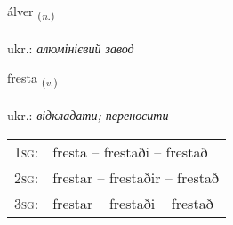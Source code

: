 \documentclass[frontgrid, backgrid]{flacards}\usepackage[]{graphicx}\usepackage[]{xcolor}
\begin{document}
\renewcommand{\flhead}{\vskip5pt \fboxsep=0pt {\small\bfseries\footnotesize Nafnorð | іменник}}
\renewcommand{\fcfoot}{\vskip5pt \fboxsep=0pt \hspace{2pt}{\small\bfseries\footnotesize 2K}}

\renewcommand{\blhead}{\vskip5pt {\small\bfseries\footnotesize Nafnorð | іменник }}
\renewcommand{\bcfoot}{\vskip5pt \hspace{2pt}{\small\bfseries\footnotesize 2K}}


{álver \small{\textsubscript{(\textit{n.})}} \\[1ex] %
\textphonetic{[aulvɛr]} \\
ukr.: \emph{алюмінієвий завод} \\  [2ex]
\renewcommand*{\arraystretch}{0.8}
}

\renewcommand{\flhead}{\vskip5pt \fboxsep=0pt {\small\bfseries\footnotesize Sagnorð | дієслово}}
\renewcommand{\fcfoot}{\vskip5pt \fboxsep=0pt \hspace{2pt}{\small\bfseries\footnotesize 2K}}

\renewcommand{\blhead}{\vskip5pt {\small\bfseries\footnotesize Sagnorð | дієслово }}
\renewcommand{\bcfoot}{\vskip5pt \hspace{2pt}{\small\bfseries\footnotesize 2K}}


{fresta \small{\textsubscript{(\textit{v.})}} \\[1ex] %
\textphonetic{[frɛsta]} \\
ukr.: \emph{відкладати; переносити} \\  [2ex]
\renewcommand*{\arraystretch}{0.8}
\begin{tabular}{p{1cm}l}
\textsc{1sg}: & fresta -- frestaði -- frestað \\ 
\textsc{2sg}: & frestar -- frestaðir -- frestað \\ 
\textsc{3sg}: & frestar -- frestaði -- frestað \\ 
\end{tabular}
}
\end{document}
